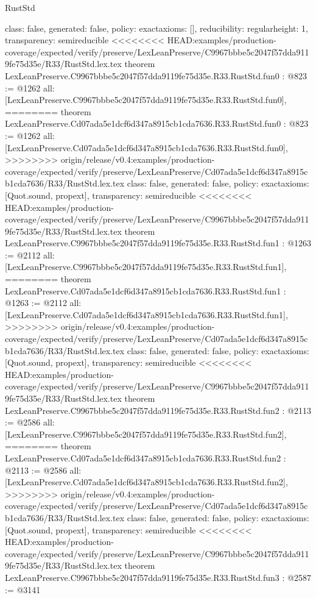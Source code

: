 \begin{lexlean}{RustStd}
\begin{coremodule}
{\begin{coremodule}
{{{  class: false,
  generated: false,
  policy: exact{axioms: []},
  reducibility: regular{height: 1},
  transparency: semireducible
}
<<<<<<<< HEAD:examples/production-coverage/expected/verify/preserve/LexLeanPreserve/C9967bbbe5c2047f57dda9119fe75d35e/R33/RustStd.lex.tex
theorem LexLeanPreserve.C9967bbbe5c2047f57dda9119fe75d35e.R33.RustStd.fun0 : @823 := @1262 {
  all: [LexLeanPreserve.C9967bbbe5c2047f57dda9119fe75d35e.R33.RustStd.fun0],
========
theorem LexLeanPreserve.Cd07ada5e1dcf6d347a8915cb1cda7636.R33.RustStd.fun0 : @823 := @1262 {
  all: [LexLeanPreserve.Cd07ada5e1dcf6d347a8915cb1cda7636.R33.RustStd.fun0],
>>>>>>>> origin/release/v0.4:examples/production-coverage/expected/verify/preserve/LexLeanPreserve/Cd07ada5e1dcf6d347a8915cb1cda7636/R33/RustStd.lex.tex
  class: false,
  generated: false,
  policy: exact{axioms: [Quot.sound, propext]},
  transparency: semireducible
}
<<<<<<<< HEAD:examples/production-coverage/expected/verify/preserve/LexLeanPreserve/C9967bbbe5c2047f57dda9119fe75d35e/R33/RustStd.lex.tex
theorem LexLeanPreserve.C9967bbbe5c2047f57dda9119fe75d35e.R33.RustStd.fun1 : @1263 := @2112 {
  all: [LexLeanPreserve.C9967bbbe5c2047f57dda9119fe75d35e.R33.RustStd.fun1],
========
theorem LexLeanPreserve.Cd07ada5e1dcf6d347a8915cb1cda7636.R33.RustStd.fun1 : @1263 := @2112 {
  all: [LexLeanPreserve.Cd07ada5e1dcf6d347a8915cb1cda7636.R33.RustStd.fun1],
>>>>>>>> origin/release/v0.4:examples/production-coverage/expected/verify/preserve/LexLeanPreserve/Cd07ada5e1dcf6d347a8915cb1cda7636/R33/RustStd.lex.tex
  class: false,
  generated: false,
  policy: exact{axioms: [Quot.sound, propext]},
  transparency: semireducible
}
<<<<<<<< HEAD:examples/production-coverage/expected/verify/preserve/LexLeanPreserve/C9967bbbe5c2047f57dda9119fe75d35e/R33/RustStd.lex.tex
theorem LexLeanPreserve.C9967bbbe5c2047f57dda9119fe75d35e.R33.RustStd.fun2 : @2113 := @2586 {
  all: [LexLeanPreserve.C9967bbbe5c2047f57dda9119fe75d35e.R33.RustStd.fun2],
========
theorem LexLeanPreserve.Cd07ada5e1dcf6d347a8915cb1cda7636.R33.RustStd.fun2 : @2113 := @2586 {
  all: [LexLeanPreserve.Cd07ada5e1dcf6d347a8915cb1cda7636.R33.RustStd.fun2],
>>>>>>>> origin/release/v0.4:examples/production-coverage/expected/verify/preserve/LexLeanPreserve/Cd07ada5e1dcf6d347a8915cb1cda7636/R33/RustStd.lex.tex
  class: false,
  generated: false,
  policy: exact{axioms: [Quot.sound, propext]},
  transparency: semireducible
}
<<<<<<<< HEAD:examples/production-coverage/expected/verify/preserve/LexLeanPreserve/C9967bbbe5c2047f57dda9119fe75d35e/R33/RustStd.lex.tex
theorem LexLeanPreserve.C9967bbbe5c2047f57dda9119fe75d35e.R33.RustStd.fun3 : @2587 := @3141 {
}}}}}}
\end{coremodule}}
\end{coremodule}
\end{lexlean}
